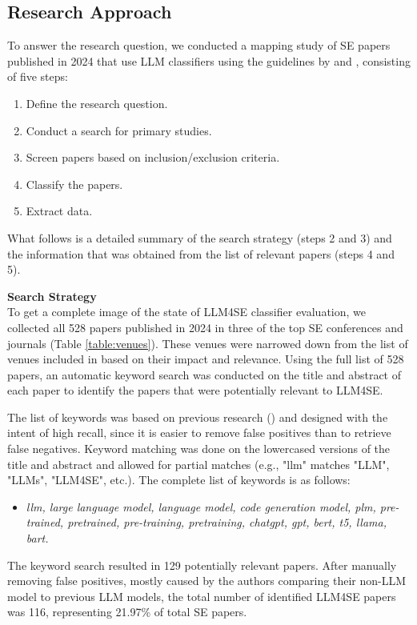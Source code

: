 \documentclass[a4paper]{article}
\begin{document}
\subsection{Research Approach}
To answer the research question, we conducted a mapping study of SE papers published in 2024 that use LLM classifiers using the guidelines by \citeauthor{kitchenham2011} \cite{kitchenham2011,kitchenham2007} and \textcite{petersen2008map}, consisting of five steps:
\begin{enumerate}
	\item Define the research question.
	\item Conduct a search for primary studies.
	\item Screen papers based on inclusion/exclusion criteria.
	\item Classify the papers.
	\item Extract data. 
\end{enumerate}

What follows is a detailed summary of the search strategy (steps 2 and 3) and the information that was obtained from the list of relevant papers (steps 4 and 5). 

\textbf{Search Strategy}\\
To get a complete image of the state of LLM4SE classifier evaluation, we collected all 528 papers published in 2024 in three of the top SE conferences and journals (Table \ref{table:venues}). These venues were narrowed down from the list of venues included in \cite{hou2024} based on their impact and relevance. Using the full list of 528 papers, an automatic keyword search was conducted on the title and abstract of each paper to identify the papers that were potentially relevant to LLM4SE.

The list of keywords was based on previous research (\cite{zhang2024,hou2024}) and designed with the intent of high recall, since it is easier to remove false positives than to retrieve false negatives. Keyword matching was done on the lowercased versions of the title and abstract and allowed for partial matches (e.g., "llm" matches "LLM", "LLMs", "LLM4SE", etc.). The complete list of keywords is as follows:
\begin{itemize}
	\item \textit{llm, large language model, language model, code generation model, plm, pre-trained, pretrained, pre-training, pretraining, chatgpt, gpt, bert, t5, llama, bart.}
\end{itemize}

The keyword search resulted in 129 potentially relevant papers. After manually removing false positives, mostly caused by the authors comparing their non-LLM model to previous LLM models, the total number of identified LLM4SE papers was 116, representing 21.97\% of total SE papers. 
\end{document}
